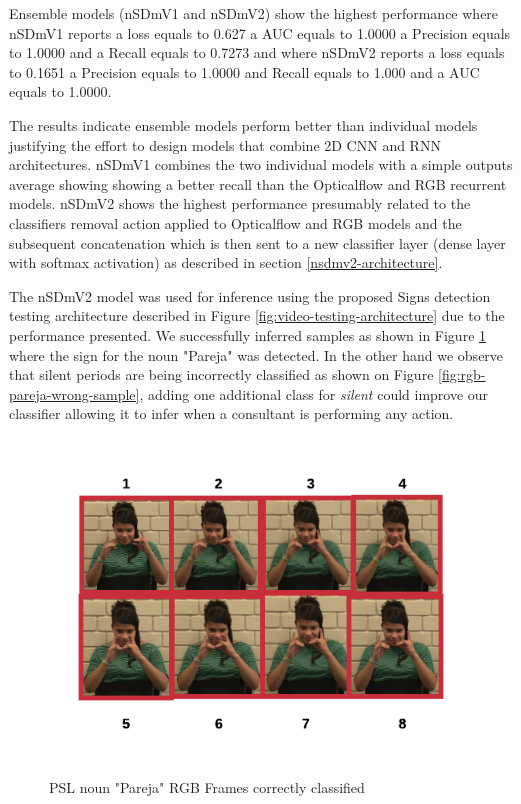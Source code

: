 \documentclass[twocolumn,conference]{article}
\begin{document}
Ensemble models (nSDmV1 and nSDmV2) show the highest performance where nSDmV1 reports a loss equals to 0.627 a AUC equals to 1.0000 a Precision equals to 1.0000 and a Recall equals to 0.7273 and where nSDmV2 reports a loss equals to 0.1651 a Precision equals to 1.0000 and Recall equals to 1.000 and a AUC equals to 1.0000.

The results indicate ensemble models perform better than individual models justifying the effort to design models that combine 2D CNN and RNN architectures. nSDmV1 combines the two individual models with a simple outputs average showing showing a better recall than the Opticalflow and RGB recurrent models. nSDmV2 shows the highest performance presumably related to the classifiers removal action applied to Opticalflow and RGB models and the subsequent concatenation which is then sent to a new classifier layer (dense layer with softmax activation) as described in section \ref{nsdmv2-architecture}.

The nSDmV2 model was used for inference using the proposed Signs detection testing architecture described in Figure \ref{fig:video-testing-architecture} due to the performance presented. We successfully inferred samples as shown in  Figure \ref{fig:rgb-pareja-sample} where the sign for the noun "Pareja" was detected. In the other hand we observe that silent periods are being incorrectly classified as shown on Figure \ref{fig:rgb-pareja-wrong-sample}, adding one additional class for \textit{silent} could improve our classifier allowing it to infer when a consultant is performing any action.

\begin{figure}[hbt!]
\includegraphics[width=\linewidth]{images/pareja-rgb-frames.png}
\caption{PSL noun "Pareja" RGB Frames correctly classified}
\label{fig:rgb-pareja-sample}
\end{figure}
\end{document}
